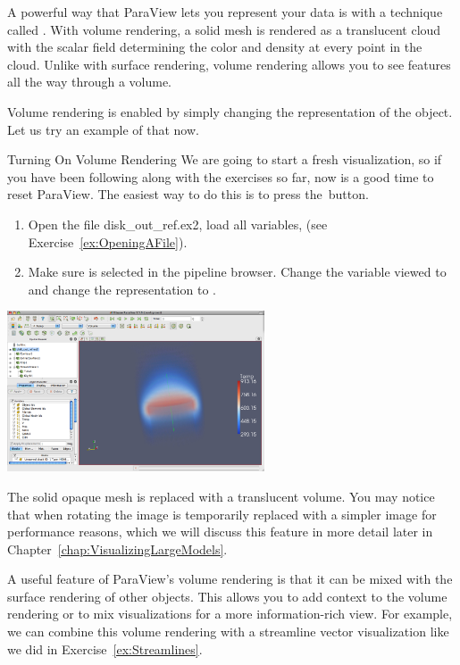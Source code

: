 A powerful way that ParaView lets you represent your data is with a
technique called .  With volume rendering, a
solid mesh is rendered as a translucent cloud with the scalar field
determining the color and density at every point in the cloud.  Unlike with
surface rendering, volume rendering allows you to see features all the way
through a volume.

Volume rendering is enabled by simply changing the representation of the
object.  Let us try an example of that now.

\begin{exercise}{Turning On Volume Rendering}
  \label{ex:VolumeRendering}%
  We are going to start a fresh visualization, so if you have been
  following along with the exercises so far, now is a good time to reset
  ParaView.  The easiest way to do this is to press the~\disconnect button.

  \begin{enumerate}
  \item Open the file disk\_out\_ref.ex2, load all variables, \apply (see
    Exercise~\ref{ex:OpeningAFile}).
  \item Make sure  is selected in the pipeline
    browser.  Change the variable viewed to  and change the
    representation to .
  \end{enumerate}

  \begin{inlinefig}
    \includegraphics[width=3in]{images/VolumeRender1}
  \end{inlinefig}

  The solid opaque mesh is replaced with a translucent volume. You may
  notice that when rotating the image is temporarily replaced with a
  simpler image for performance reasons, which we will discuss this feature
  in more detail later in Chapter~\ref{chap:VisualizingLargeModels}.
\end{exercise}

A useful feature of ParaView’s volume rendering is that it can be mixed
with the surface rendering of other objects.  This allows you to add
context to the volume rendering or to mix visualizations for a more
information-rich view.  For example, we can combine this volume rendering
with a streamline vector visualization like we did in
Exercise~\ref{ex:Streamlines}.

